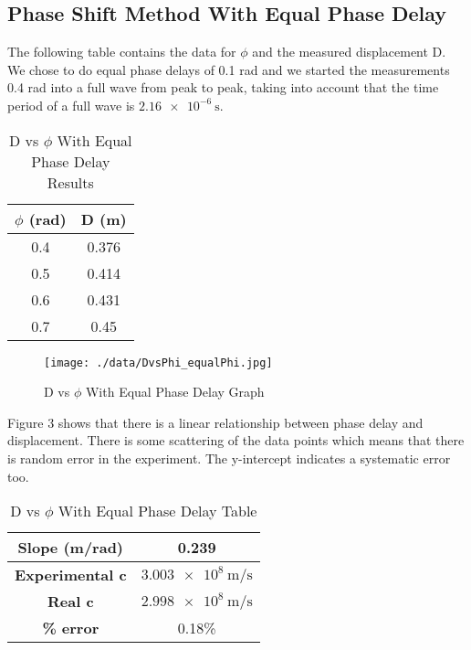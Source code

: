 \documentclass[12pt]{article}
\begin{document}
	\subsection{Phase Shift Method With Equal Phase Delay}
	
	The following table contains the data for $\phi$ and the measured displacement D. We chose to do equal phase delays of 0.1 rad and we started the measurements 0.4 rad into a full wave from peak to peak, taking into account that the time period of a full wave is $\qty{2.16e-6}{\second}$.

	\begin{table}[!h]
		\centering
		\caption{D vs $\phi$ With Equal Phase Delay Results}
		\label{DvsPhi_EqualPhiResults}
		\begin{tabular}{|c|c|}
			\hline
			\textbf{$\phi$ (rad)} & \textbf{D (m)} \\
			\hline
			0.4 & 0.376 \\
			\hline
			0.5 & 0.414 \\
			\hline
			0.6 & 0.431 \\
			\hline
			0.7 & 0.45 \\
			\hline
		\end{tabular}
	\end{table}
	
	\begin{figure}[!h]
		\centering
		\caption{D vs $\phi$ With Equal Phase Delay Graph}
		\label{DvsPhi_EqualPhiGraph}
		\texttt{[image: ./data/DvsPhi\_equalPhi.jpg]}
	\end{figure}
	Figure 3 shows that there is a linear relationship between phase delay and displacement. There is some scattering of the data points which means that there is random error in the experiment. The y-intercept indicates a systematic error too.

\clearpage

	\begin{table}[!h]
		\centering
		\caption{D vs $\phi$ With Equal Phase Delay Table}
		\label{DvsPhi_EqualPhiTable}
		\begin{tabular}{|c|c|}
			\hline
			\textbf{Slope (m/rad)} & 0.239 \\
			\hline
			\textbf{Experimental c} & $\qty{3.003e8}{\meter\per\second}$ \\
			\hline
			\textbf{Real c} & $\qty{2.998e8}{\meter\per\second}$ \\
			\hline
			\textbf{\% error} & 0.18\% \\
			\hline
		\end{tabular}
	\end{table}
\end{document}
